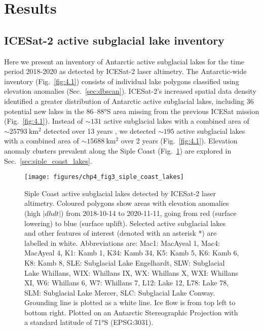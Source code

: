 \clearpage
\section{Results}

\subsection{ICESat-2 active subglacial lake inventory}

Here we present an inventory of Antarctic active subglacial lakes for the time period 2018-2020 as detected by ICESat-2 laser altimetry.
The Antarctic-wide inventory (Fig.~\ref{fig:4.1}) consists of individual lake polygons classified using elevation anomalies (Sec.~\ref{sec:dbscan}).
ICESat-2's increased spatial data density identified a greater distribution of Antarctic active subglacial lakes, including 36 potential new lakes in the 86–88°S area missing from the previous ICESat mission (Fig.~\ref{fig:4.1}).
Instead of $\sim131$ active subglacial lakes with a combined area of $\sim\SI{25793}{\kilo\metre\squared}$ detected over 13 years \citep{SiegfriedThirteenyearssubglacial2018}, we detected $\sim195$ active subglacial lakes with a combined area of $\sim\SI{15688}{\kilo\metre\squared}$ over 2 years (Fig.~\ref{fig:4.1}). %
Elevation anomaly clusters prevalent along the Siple Coast (Fig.~\ref{fig:4.3}) are explored in Sec.~\ref{sec:siple_coast_lakes}.

\begin{figure}[htbp]
  \texttt{[image: figures/chp4\_fig3\_siple\_coast\_lakes]}
  \caption[Siple Coast active subglacial lakes detected by ICESat-2 laser altimetry]{
    Siple Coast active subglacial lakes detected by ICESat-2 laser altimetry.
    Coloured polygons show areas with elevation anomalies (high $|dhdt|$) from 2018-10-14 to 2020-11-11, going from red (surface lowering) to blue (surface uplift).
    Selected active subglacial lakes and other features of interest (denoted with an asterisk *) are labelled in white.
    Abbreviations are: Mac1: MacAyeal 1, Mac4: MacAyeal 4, K1: Kamb 1, K34: Kamb 34, K5: Kamb 5, K6: Kamb 6, K8: Kamb 8, SLE: Subglacial Lake Engelhardt, SLW: Subglacial Lake Whillans, WIX: Whillans IX, WX: Whillans X, WXI: Whillans XI, W6: Whillans 6, W7: Whillans 7, L12: Lake 12, L78: Lake 78, SLM: Subglacial Lake Mercer, SLC: Subglacial Lake Conway.
    Grounding line \citep{DepoorterAntarcticmasksiceshelves2013} is plotted as a white line.
    Ice flow is from top left to bottom right.
    Plotted on an Antarctic Stereographic Projection with a standard latitude of 71°S (EPSG:3031).
  }
  \label{fig:4.3}
\end{figure}

